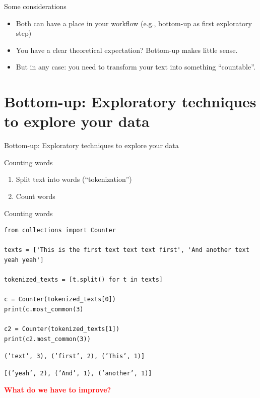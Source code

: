 \documentclass{beamer}
\begin{document}
\begin{frame}{Some considerations}
\begin{itemize}[<+->]
	\item Both can have a place in your workflow (e.g., bottom-up as first exploratory step)
	\item You have a clear theoretical expectation? Bottom-up makes little sense.
	\item But in any case: you need to transform your text into something ``countable''.
\end{itemize}
\end{frame}


\section{Bottom-up: Exploratory techniques to explore your data}
\begin{frame}[plain]
Bottom-up: Exploratory techniques to explore your data
\end{frame}



\begin{frame}{Counting words}
\begin{enumerate}
	\item Split text into words (``tokenization'')
	\item Count words
\end{enumerate}
\end{frame}

\begin{frame}[fragile]{Counting words}
\begin{lstlisting}
from collections import Counter

texts = ['This is the first text text text first', 'And another text yeah yeah']

tokenized_texts = [t.split() for t in texts] 

c = Counter(tokenized_texts[0]) 
print(c.most_common(3) 

c2 = Counter(tokenized_texts[1]) 
print(c2.most_common(3)) 

\end{lstlisting}

\texttt{('text', 3), ('first', 2), ('This', 1)]}

\texttt{[('yeah', 2), ('And', 1), ('another', 1)]}

\pause

\textbf{\textcolor{red}{What do we have to improve?}}

\end{frame}
\end{document}
